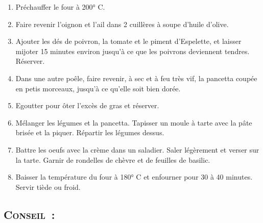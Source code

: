 \begin{enumerate}
\item Pr\'echauffer le four \`a 200° C. 

\item Faire revenir l'oignon et l'ail dans 2 cuill\`eres \`a soupe d'huile d'olive. 

\item Ajouter les d\'es de poivron, la tomate et le piment d'Espelette, et laisser mijoter 15 minutes environ jusqu'\`a ce que les poivrons deviennent tendres. R\'eserver. 

\item Dans une autre po\^ele, faire revenir, \`a sec et \`a feu tr\`es vif, la pancetta coup\'ee en petis morceaux, jusqu'\`a ce qu'elle soit bien dor\'ee. 

\item Egoutter pour ôter l'exc\`es de gras et r\'eserver.

\item M\'elanger les l\'egumes et la pancetta. Tapisser un moule \`a tarte avec la p\^ate bris\'ee et la piquer. R\'epartir les l\'egumes dessus.

\item Battre les oeufs avec la cr\`eme dans un saladier. Saler l\'eg\`erement et verser sur la tarte. Garnir de rondelles de ch\`evre et de feuilles de basilic.

\item Baisser la temp\'erature du four \`a 180° C et enfourner pour 30 \`a 40 minutes. Servir ti\`ede ou froid.
\end{enumerate}
\subsection*{\textsc{Conseil~:}}


